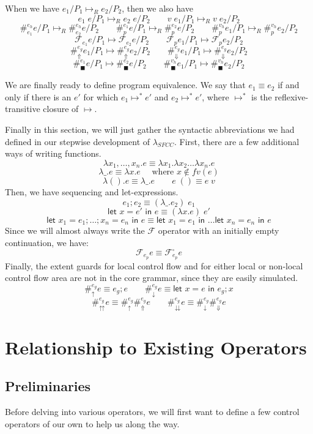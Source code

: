 \documentclass[11pt]{article}
\newcommand{\maybePage}{\newpage}
\newcommand\x{\lambda x}
\newcommand{\letin}[2]{\textsf{let }#1\textsf{ in }#2}
\newcommand\F{\mathcal{F}}
\begin{document}
When we have $e_1/P_1 \mapsto_R e_2/P_2$, then we also have
$$e_1\;e/P_1 \mapsto_R e_2\;e/P_2 \qquad
  v\;e_1/P_1 \mapsto_R v\;e_2/P_2$$
$$\#_{e_1}^{e_h}e/P_1 \mapsto_R \#_{e_2}^{e_h}e/P_2 \qquad
  \#_{p}^{e_1}e/P_1 \mapsto_R \#_{p}^{e_2}e/P_2 \qquad
  \#_{p}^{v_h}e_1/P_1 \mapsto_R \#_{p}^{v_h}e_2/P_2$$
$$\F_{e_1} e/P_1 \mapsto \F_{e_2} e/P_2 \qquad
  \F_{p} e_1/P_1 \mapsto \F_{p} e_2/P_2$$
$$\#_\Uparrow^{e_g}e_1/P_1 \mapsto \#_\Uparrow^{e_g}e_2/P_2 \qquad
  \#_\Downarrow^{e_g}e_1/P_1 \mapsto \#_\Downarrow^{e_g}e_2/P_2$$
$$\#_\blacksquare^{e_1}e/P_1 \mapsto \#_\blacksquare^{e_2}e/P_2 \qquad
  \#_\blacksquare^{v_h}e_1/P_1 \mapsto \#_\blacksquare^{v_h}e_2/P_2$$

We are finally ready to define program equivalence.
We say that $e_1 \equiv e_2$ if and only if there is an $e'$ for which $e_1 \mapsto^* e'$ and $e_2 \mapsto^* e'$, where $\mapsto^*$ is the reflexive-transitive closure of $\mapsto$.

Finally in this section, we will just gather the syntactic abbreviations we had defined in our stepwise development of $\lambda_{SFCC}$.
First, there are a few additional ways of writing functions.
$$\x_1,\ldots,x_n.e \equiv \x_1.\x_2\ldots\x_n.e$$
$$\lambda\_.e \equiv \x.e \quad\textrm{ where }x \notin fv(e)$$
$$\lambda().e \equiv \lambda\_.e \qquad
  e\;() \equiv e\;v$$
Then, we have sequencing and let-expressions.
$$e_1; e_2 \equiv (\lambda\_.e_2)\;e_1$$
$$\letin{x = e'}{e} \equiv (\x.e)\;e'$$
$$\letin{x_1 = e_1; \ldots; x_n = e_n}{e} \equiv \letin{x_1 = e_1}{\ldots\letin{x_n = e_n}{e}}$$
Since we will almost always write the $\F$ operator with an initially empty continuation, we have:
$$\F_{e_p}e \equiv \F_{e_p}^{\square}e$$
Finally, the extent guards for local control flow and for either local or non-local control flow area are not in the core grammar, since they are easily simulated.
$$\#_\uparrow^{e_g}e \equiv e_g; e \qquad
  \#_\downarrow^{e_g}e \equiv \letin{x=e}{e_g; x}$$
$$\#_\upuparrows^{e_g}e \equiv \#_\uparrow^{e_g}\#_\Uparrow^{e_g}e \qquad
  \#_\downdownarrows^{e_g}e \equiv \#_\downarrow^{e_g}\#_\Downarrow^{e_g}e$$





\maybePage
\section{Relationship to Existing Operators}
\label{sec:relationship}

\subsection{Preliminaries}
Before delving into various operators, we will first want to define a few control operators of our own to help us along the way.
\end{document}
